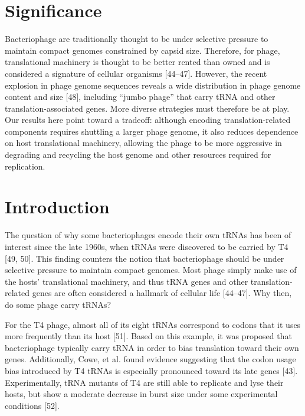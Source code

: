 \documentclass[12pt,twoside]{mitthesis-manusdown}
\begin{document}
\section{Significance}\label{significance}

Bacteriophage are traditionally thought to be under selective pressure
to maintain compact genomes constrained by capsid size. Therefore, for
phage, translational machinery is thought to be better rented than owned
and is considered a signature of cellular organisms {[}44--47{]}.
However, the recent explosion in phage genome sequences reveals a wide
distribution in phage genome content and size {[}48{]}, including
``jumbo phage'' that carry tRNA and other translation-associated genes.
More diverse strategies must therefore be at play. Our results here
point toward a tradeoff: although encoding translation-related
components requires shuttling a larger phage genome, it also reduces
dependence on host translational machinery, allowing the phage to be
more aggressive in degrading and recycling the host genome and other
resources required for replication.

\section{Introduction}\label{introduction}

The question of why some bacteriophages encode their own tRNAs has been
of interest since the late 1960s, when tRNAs were discovered to be
carried by T4 {[}49, 50{]}. This finding counters the notion that
bacteriophage should be under selective pressure to maintain compact
genomes. Most phage simply make use of the hosts' translational
machinery, and thus tRNA genes and other translation-related genes are
often considered a hallmark of cellular life {[}44--47{]}. Why then, do
some phage carry tRNAs?

For the T4 phage, almost all of its eight tRNAs correspond to codons
that it uses more frequently than its host {[}51{]}. Based on this
example, it was proposed that bacteriophage typically carry tRNA in
order to bias translation toward their own genes. Additionally, Cowe, et
al. found evidence suggesting that the codon usage bias introduced by T4
tRNAs is especially pronounced toward its late genes {[}43{]}.
Experimentally, tRNA mutants of T4 are still able to replicate and lyse
their hosts, but show a moderate decrease in burst size under some
experimental conditions {[}52{]}.
\end{document}
